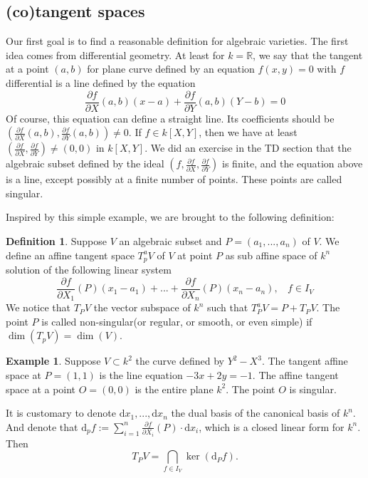 \documentclass[12pt,a4paper,english]{article}
\theoremstyle{plain}
\theoremstyle{definition}
\newtheorem{defi}{Definition}
\newtheorem*{example}{Example}
\theoremstyle{remark}
\begin{document}
\subsection{(co)tangent spaces}
Our first goal is to find a reasonable definition for algebraic varieties. The first idea comes from differential geometry. At least for $k=\mathbb{R}$, we say that the tangent at a point $(a,b)$  for plane curve defined by an equation $f(x,y)=0$ with $f$ differential is a line defined by the equation 
\begin{equation*}
    \frac{\partial f}{\partial X}(a,b)(x-a)+\frac{\partial f}{\partial Y}(a,b)(Y-b)=0
\end{equation*}
Of course, this equation can define a straight line. Its coefficients should be $(\frac{\partial f}{\partial X}(a,b),\frac{\partial f}{\partial Y}(a,b))\not=0$. If $f\in k[X,Y]$, then we have at least $(\frac{\partial f}{\partial X},\frac{\partial f}{\partial Y})\not=(0,0)$ in $k[X, Y]$. We did an exercise in the TD section that the algebraic subset defined by the ideal $(f, \frac{\partial f}{\partial X}, \frac{\partial f}{\partial Y})$ is finite, and the equation above is a line, except possibly at a finite number of points. These points are called singular.

Inspired by this simple example, we are brought to the following definition:
\begin{defi}
Suppose $V$ an algebraic subset and $P=(a_{1},...,a_{n})$ of $V$. We define an affine tangent space $T_{p}^{a}V$ of $V$ at point $P$  as sub affine space of $k^{n}$ solution  of the following linear system 
\begin{equation*}
    \frac{\partial f}{\partial X_{1}}(P)(x_{1}-a_{1})+...+\frac{\partial f}{\partial X_{n}}(P)(x_{n}-a_{n}),\ \ \ \ f\in I_{V}
\end{equation*}
We notice that $T_{P}V$ the vector subspace of $k^{n}$ such that $T_{P}^{a}V=P+T_{P}V$. The point $P$ is called non-singular(or regular, or smooth, or even simple) if $\dim(T_{p}V)=\dim(V)$.   
\end{defi}


\begin{example}
Suppose $V\subset k^{2}$ the curve defined by $Y^{2}-X^{3}$. The tangent affine space at $P=(1,1)$ is the line equation $-3x+2y=-1$. The affine tangent space at a point $O=(0,0)$ is the entire plane $k^{2}$. The point $O$ is singular. 


\end{example}
It is customary to denote $\text{d}x_{1},...,\text{d}x_{n}$ the dual basis of the canonical basis of $k^{n}$. And denote that $\text{d}_{p}f:=\sum^{n}_{i=1}\frac{\partial f}{\partial X_{i}}(P)\cdot\text{d}x_{i}$, which is a closed linear form for $k^{n}$. Then 
\begin{equation*}
    T_{P}V=\bigcap_{f\in I_{V}}\ker(\text{d}_{P}f). 
\end{equation*}
\end{document}
